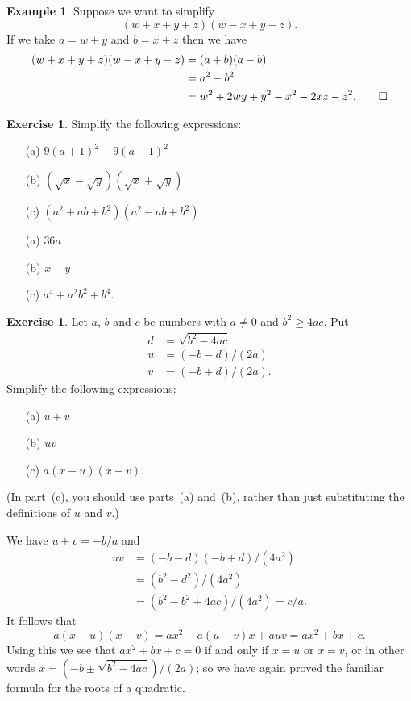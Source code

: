 \documentclass[a4paper]{book}
\renewcommand{\:}{\colon}
\theoremstyle{definition}
\newtheorem{example}[theorem]{Example}
\newtheorem{exercise}[theorem]{Exercise}
\renewenvironment{solution}{\SolutionInline}{\endSolutionInline}
\begin{document}
\begin{example}
 Suppose we want to simplify
 \[ (w+x+y+z)(w-x+y-z). \]
 If we take $a=w+y$ and $b=x+z$ then we have
 \begin{align*}
  (w+x+y+z)(w-x+y-z) &= (a+b)(a-b) \\
                     &= a^2 - b^2 \\
                     &= w^2 + 2wy + y^2 - x^2 - 2xz - z^2. \qed
 \end{align*}
\end{example}

\begin{exercise}
 Simplify the following expressions:
 \begin{itemize}
  \item[(a)] $9(a+1)^2 - 9(a-1)^2$
  \item[(b)] $(\sqrt{x} - \sqrt{y})(\sqrt{x} + \sqrt{y})$
  \item[(c)] $(a^2+ab+b^2)(a^2-ab+b^2)$
 \end{itemize}
\end{exercise}
\begin{solution}
 \begin{itemize}
  \item[(a)] $36a$
  \item[(b)] $x-y$
  \item[(c)] $a^4+a^2b^2+b^4$.
 \end{itemize}
\end{solution}

\begin{exercise}
 Let $a$, $b$ and $c$ be numbers with $a\neq 0$ and $b^2\geq 4ac$.
 Put
 \begin{align*}
  d &= \sqrt{b^2 - 4ac} \\
  u &= (-b-d)/(2a) \\
  v &= (-b+d)/(2a).
 \end{align*}
 Simplify the following expressions:
 \begin{itemize}
  \item[(a)] $u+v$
  \item[(b)] $uv$
  \item[(c)] $a(x-u)(x-v)$. 
 \end{itemize}
 (In part~(c), you should use parts~(a) and~(b), rather than just
 substituting the definitions of $u$ and $v$.)
\end{exercise}
\begin{solution}
 We have $u+v=-b/a$ and
 \begin{align*}
  uv &= (-b-d)(-b+d)/(4a^2) \\
     &= (b^2-d^2)/(4a^2) \\
     &= (b^2 - b^2 + 4ac)/(4a^2) = c/a.
 \end{align*}
 It follows that
 \[ a(x-u)(x-v) = a x^2 - a(u+v)x + auv =
     a x^2 + b x + c.
 \]
 Using this we see that $ax^2+bx+c=0$ if and only if $x=u$ or $x=v$,
 or in other words $x=(-b\pm\sqrt{b^2-4ac})/(2a)$; so we have again
 proved the familiar formula for the roots of a quadratic.
\end{solution}
\end{document}
